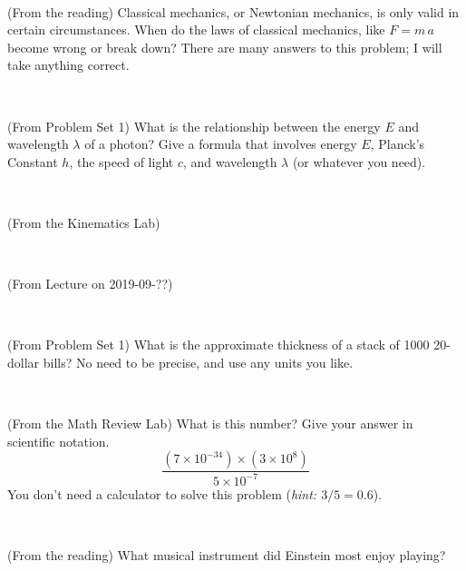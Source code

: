 \documentclass[12pt, letterpaper]{article}
\begin{document}
\vfill ~

\begin{problem} (From the reading)
Classical mechanics, or Newtonian mechanics, is only valid in certain
circumstances. When do the laws of classical mechanics, like $F =
m\,a$ become wrong or break down? There are many answers to this
problem; I will take anything correct.
\end{problem}


\vfill ~

\begin{problem} (From Problem Set 1)
What is the relationship between the energy $E$ and wavelength
$\lambda$ of a photon? Give a formula that involves energy $E$,
Planck's Constant $h$, the speed of light $c$, and wavelength
$\lambda$ (or whatever you need).
\end{problem}

\vfill ~

\begin{problem} (From the Kinematics Lab)

\end{problem}


\vfill ~


\clearpage


\begin{problem} (From Lecture on 2019-09-??)
\end{problem}


\vfill ~

\begin{problem} (From Problem Set 1)
What is the approximate thickness of a stack of 1000 20-dollar bills?
No need to be precise, and use any units you like.
\end{problem}


\vfill ~

\begin{problem} (From the Math Review Lab)
What is this number? Give your answer in scientific notation.
$$
\frac{(7\times10^{-34})\times(3\times10^8)}{5\times10^{-7}}
$$
You don't need a calculator to solve this problem (\textit{hint: $3/5=0.6$}).
\end{problem}


\vfill ~

\begin{problem} (From the reading)
What musical instrument did Einstein most enjoy playing?
\end{problem}


\vfill ~


\cleardoublepage
\end{document}
